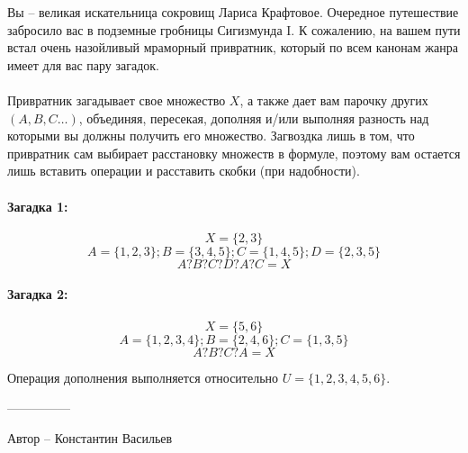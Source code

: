\question
Вы -- великая искательница сокровищ Лариса Крафтовое. Очередное путешествие забросило вас в подземные гробницы Сигизмунда I. К сожалению, на вашем пути встал очень назойливый мраморный привратник, который по всем канонам жанра имеет для вас пару загадок.
\\
\\
Привратник загадывает свое множество $X$, а также дает вам парочку других $(A,B,C…)$, объединяя, пересекая, дополняя и/или выполняя разность над которыми вы должны получить его множество. Загвоздка лишь в том, что привратник сам выбирает расстановку множеств в формуле, поэтому вам остается лишь вставить операции и расставить скобки (при надобности).

\paragraph{Загадка 1:}
\begin{equation*}
    X=\{2,3\}
\end{equation*}
\begin{equation*}
    A=\{1,2,3\}; B=\{3,4,5\}; C=\{1,4,5\}; D=\{2,3,5\}
    \end{equation*}
\begin{equation*}
    A ? B ? C ? D ? A ? C = X
\end{equation*}

\paragraph{Загадка 2:}
\begin{equation*}
    X=\{5,6\}
\end{equation*}
\begin{equation*}
    A=\{1,2,3,4\}; B=\{2,4,6\}; C=\{1,3,5\}
    \end{equation*}
\begin{equation*}
    A ? B ? C ? A = X
\end{equation*}

Операция дополнения выполняется относительно $U=\{1,2,3,4,5,6\}$.

---------------

Автор -- Константин Васильев
